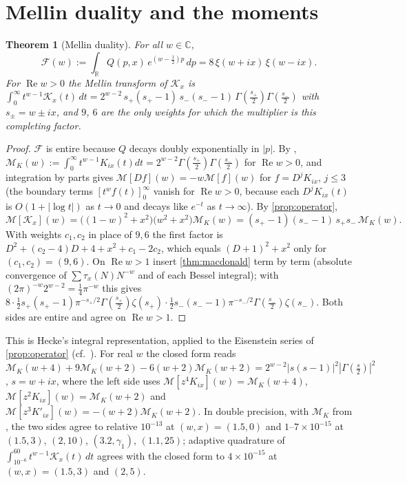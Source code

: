 \documentclass[11pt]{article}
\newtheorem{theorem}{Theorem}[section]
\theoremstyle{definition}\newtheorem{definition}[theorem]{Definition}
\theoremstyle{remark}\newtheorem{remark}[theorem]{Remark}
\newcommand{\R}{\mathbb R}\newcommand{\C}{\mathbb C}\newcommand{\N}{\mathbb N}
\renewcommand{\Re}{\operatorname{Re}}\renewcommand{\Im}{\operatorname{Im}}
\begin{document}
\section{Mellin duality and the moments}\label{sec:mellin}

\begin{theorem}[Mellin duality]\label{thm:mellin}
For all $w\in\C$,
\[
\mathcal F(w):=\int_\R Q(p,x)\,e^{(w-\frac12)p}\,dp=8\,\xi(w+ix)\,\xi(w-ix).
\]
For $\Re w>0$ the Mellin transform of $\mathcal K_x$ is $\int_0^\infty t^{w-1}\mathcal K_x(t)\,dt=2^{w-2}\,s_+(s_+-1)\,s_-(s_--1)\,\Gamma(\frac{s_+}2)\Gamma(\frac{s_-}2)$ with $s_\pm=w\pm ix$, and $9$, $6$ are the only weights for which the multiplier is this completing factor.
\end{theorem}
\begin{proof}
$\mathcal F$ is entire because $Q$ decays doubly exponentially in $|p|$. By \cite[10.43.19]{DLMF}, $\mathcal M_K(w):=\int_0^\infty t^{w-1}K_{ix}(t)dt=2^{w-2}\Gamma(\frac{s_+}2)\Gamma(\frac{s_-}2)$ for $\Re w>0$, and integration by parts gives $\mathcal M[Df](w)=-w\mathcal M[f](w)$ for $f=D^jK_{ix}$, $j\le3$ (the boundary terms $[t^wf(t)]_0^\infty$ vanish for $\Re w>0$, because each $D^jK_{ix}(t)$ is $O(1+|\log t|)$ as $t\to0$ and decays like $e^{-t}$ as $t\to\infty$). By \cref{prop:operator},
\[
\mathcal M[\mathcal K_x](w)=\bigl((1-w)^2+x^2\bigr)\bigl(w^2+x^2\bigr)\mathcal M_K(w)=(s_+-1)(s_--1)\,s_+s_-\,\mathcal M_K(w).
\]
With weights $c_1,c_2$ in place of $9,6$ the first factor is $D^2+(c_2-4)D+4+x^2+c_1-2c_2$, which equals $(D+1)^2+x^2$ only for $(c_1,c_2)=(9,6)$. On $\Re w>1$ insert \cref{thm:macdonald} term by term (absolute convergence of $\sum\tau_x(N)N^{-w}$ and of each Bessel integral); with $(2\pi)^{-w}2^{w-2}=\frac14\pi^{-w}$ this gives $8\cdot\frac12s_+(s_+-1)\pi^{-s_+/2}\Gamma(\frac{s_+}2)\zeta(s_+)\cdot\frac12s_-(s_--1)\pi^{-s_-/2}\Gamma(\frac{s_-}2)\zeta(s_-)$. Both sides are entire and agree on $\Re w>1$.
\end{proof}
This is Hecke's integral representation, applied to the Eisenstein series of \cref{prop:operator} (cf.\ \cite[Ch.~3]{Iwaniec}). For real $w$ the closed form reads $\mathcal M_K(w+4)+9\mathcal M_K(w+2)-6(w+2)\mathcal M_K(w+2)=2^{w-2}|s(s-1)|^2|\Gamma(\frac s2)|^2$, $s=w+ix$, where the left side uses $\mathcal M[z^4K_{ix}](w)=\mathcal M_K(w+4)$, $\mathcal M[z^2K_{ix}](w)=\mathcal M_K(w+2)$ and $\mathcal M[z^3K'_{ix}](w)=-(w+2)\mathcal M_K(w+2)$. In double precision, with $\mathcal M_K$ from \cite[10.43.19]{DLMF}, the two sides agree to relative $10^{-13}$ at $(w,x)=(1.5,0)$ and $1$--$7\times10^{-15}$ at $(1.5,3)$, $(2,10)$, $(3.2,\gamma_1)$, $(1.1,25)$; adaptive quadrature of $\int_{10^{-6}}^{60}t^{w-1}\mathcal K_x(t)\,dt$ agrees with the closed form to $4\times10^{-15}$ at $(w,x)=(1.5,3)$ and $(2,5)$.
\end{document}
